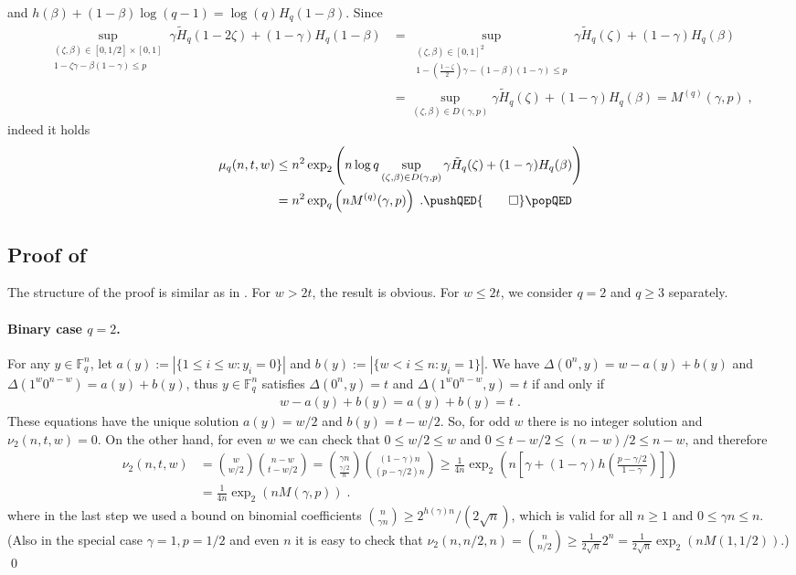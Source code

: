 \documentclass{article}
\newcommand{\bF}{\mathbb{F}}
\theoremstyle{plain}
\theoremstyle{plain}
\theoremstyle{plain}
\theoremstyle{plain}
\theoremstyle{plain}
\theoremstyle{plain}
\theoremstyle{plain}
\theoremstyle{plain}
\theoremstyle{plain}
\theoremstyle{plain}
\theoremstyle{remark}
\theoremstyle{remark}
\theoremstyle{remark}
\theoremstyle{plain}
\begin{document}
and $h(\beta)+(1-\beta)\log(q-1)=\log(q)H_q(1-\beta)$. Since
\begin{align*}
\underset{\substack{(\zeta,\beta)\in[0,1/2]\times[0,1]\\1- \zeta\gamma - \beta(1-\gamma) \le p}}{\sup}\gamma\tilde{H}_q(1-2\zeta)+(1-\gamma)H_q(1-\beta)
&=\underset{\substack{(\zeta,\beta)\in[0,1]^2\\1-(\frac{1-\zeta}{2})\gamma - (1-\beta)(1-\gamma) \le p}}{\sup}\gamma\tilde{H}_q(\zeta)+(1-\gamma)H_q(\beta)\\
&=\sup_{(\zeta,\beta)\in D(\gamma,p)}
\gamma\tilde{H}_q(\zeta)+(1-\gamma)H_q(\beta)
=M^{(q)}(\gamma,p)\;,
\end{align*}
indeed it holds
\begin{align*}
    \mu_q(n,t,w)&
    \le n^2 \exp_2{\left(n \log q
    \sup_{(\zeta,\beta)\in D(\gamma,p)}
\gamma\tilde{H}_q(\zeta)+(1-\gamma)H_q(\beta)
    \right)}\\&=
    n^2\exp_q\left(nM^{(q)}(\gamma,p)\right)\;.
    \pushQED{\qed}\qedhere\popQED
\end{align*}

\subsection{Proof of }

The structure of the proof is similar
as in .
For  $w > 2t$, the result is obvious.
For $w\le 2t$, we consider $q=2$
and $q\ge 3$ separately.

\paragraph{Binary case $q=2$.}
For any $y\in\bF^n_q$, let $a(y):=|\{1\le i\le w : y_i=0\}|$ and $b(y):=|\{w<i\le n: y_i= 1\}|$. We have $\Delta(0^n,y)=w-a(y)+b(y)$ and $\Delta(1^w0^{n-w})=a(y)+b(y)$,
thus $y\in\bF^n_q$ satisfies $\Delta(0^n,y)=t$ and $\Delta(1^w0^{n-w},y)=t$
if and only if
\begin{align*}
    w-a(y)+b(y)=a(y)+b(y)=t\;.
\end{align*}
These equations have the unique solution
$a(y)=w/2$ and $b(y)=t-w/2$.
So, for odd $w$ there is no integer solution
and $\nu_2(n,t,w)=0$. On the other hand,
for even $w$ we can check
that $0\le w/2\le w$ and
$0\le t-w/2\le (n-w)/2\le n-w$,
and therefore
\begin{align*}
\nu_2(n,t,w)&=
\binom{w}{w/2}\binom{n-w}{t-w/2}
=\binom{\gamma n}{\frac{\gamma/2}n}
\binom{(1-\gamma)n}{(p-\gamma/2)n}
\ge\frac{1}{4n}
\exp_2\left(n\left[\gamma+(1-\gamma)
h\left(\frac{p-\gamma/2}{1-\gamma}\right)\right]\right)\\
&=\frac{1}{4n}\exp_2\left(nM(\gamma,p)\right)\;.
\end{align*}
where in the last step we used a bound on binomial
coefficients $\binom{n}{\gamma n}\ge 
2^{h(\gamma)n}/(2\sqrt{n})$, which is valid
for all $n\ge 1$ and $0\le\gamma n\le n$.
(Also in the special case $\gamma=1,p=1/2$
and even $n$ it is easy to check
that $\nu_2(n,n/2,n)=\binom{n}{n/2}\ge\frac{1}{2\sqrt{n}}
2^n=\frac{1}{2\sqrt{n}}\exp_2(nM(1,1/2))$.)
\qed
\end{document}
